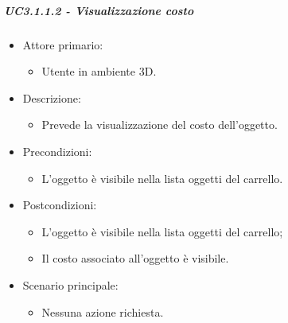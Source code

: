 \subparagraph{UC3.1.1.2 - Visualizzazione costo}
\begin{itemize}
	
	\item Attore primario: 
	\begin{itemize}
		\item Utente in ambiente 3D.
	\end{itemize}
	\item Descrizione:
	\begin{itemize}
		\item Prevede la visualizzazione del costo dell'oggetto.
	\end{itemize}
	
	\item Precondizioni:
	\begin{itemize}
		\item L'oggetto è visibile nella lista oggetti del carrello.
	\end{itemize}
	
	\item Postcondizioni:
	\begin{itemize}
		\item L'oggetto è visibile nella lista oggetti del carrello;
		\item Il costo associato all'oggetto è visibile.
	\end{itemize}
	
	\item Scenario principale:
	\begin{itemize}
		\item Nessuna azione richiesta.
	\end{itemize}
	
\end{itemize}


